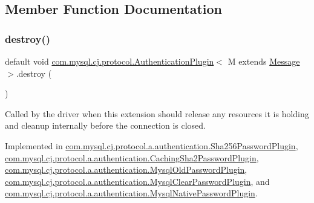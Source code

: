 \subsection{Member Function Documentation}
\mbox{\label{interfacecom_1_1mysql_1_1cj_1_1protocol_1_1_authentication_plugin_a1978dd8a16052ae403299d59a4412ac8}} 
\subsubsection{\texorpdfstring{destroy()}{destroy()}}
{\footnotesize\ttfamily default void \mbox{\hyperlink{interfacecom_1_1mysql_1_1cj_1_1protocol_1_1_authentication_plugin}{com.\+mysql.\+cj.\+protocol.\+Authentication\+Plugin}}$<$ M extends \mbox{\hyperlink{interfacecom_1_1mysql_1_1cj_1_1protocol_1_1_message}{Message}} $>$.destroy (\begin{DoxyParamCaption}{ }\end{DoxyParamCaption})}

Called by the driver when this extension should release any resources it is holding and cleanup internally before the connection is closed. 

Implemented in \mbox{\hyperlink{classcom_1_1mysql_1_1cj_1_1protocol_1_1a_1_1authentication_1_1_sha256_password_plugin_a4755bae2cd1dda2546c6a338a192e7ca}{com.\+mysql.\+cj.\+protocol.\+a.\+authentication.\+Sha256\+Password\+Plugin}}, \mbox{\hyperlink{classcom_1_1mysql_1_1cj_1_1protocol_1_1a_1_1authentication_1_1_caching_sha2_password_plugin_ae1487e57db91585f60ffa884c6f10a54}{com.\+mysql.\+cj.\+protocol.\+a.\+authentication.\+Caching\+Sha2\+Password\+Plugin}}, \mbox{\hyperlink{classcom_1_1mysql_1_1cj_1_1protocol_1_1a_1_1authentication_1_1_mysql_old_password_plugin_a4f0ccfe554748824d036259089e8475d}{com.\+mysql.\+cj.\+protocol.\+a.\+authentication.\+Mysql\+Old\+Password\+Plugin}}, \mbox{\hyperlink{classcom_1_1mysql_1_1cj_1_1protocol_1_1a_1_1authentication_1_1_mysql_clear_password_plugin_aba0d857281cb3a18fe00d3e3d8b63016}{com.\+mysql.\+cj.\+protocol.\+a.\+authentication.\+Mysql\+Clear\+Password\+Plugin}}, and \mbox{\hyperlink{classcom_1_1mysql_1_1cj_1_1protocol_1_1a_1_1authentication_1_1_mysql_native_password_plugin_aaf129d7de527f4b5f703903067f44f5f}{com.\+mysql.\+cj.\+protocol.\+a.\+authentication.\+Mysql\+Native\+Password\+Plugin}}.

